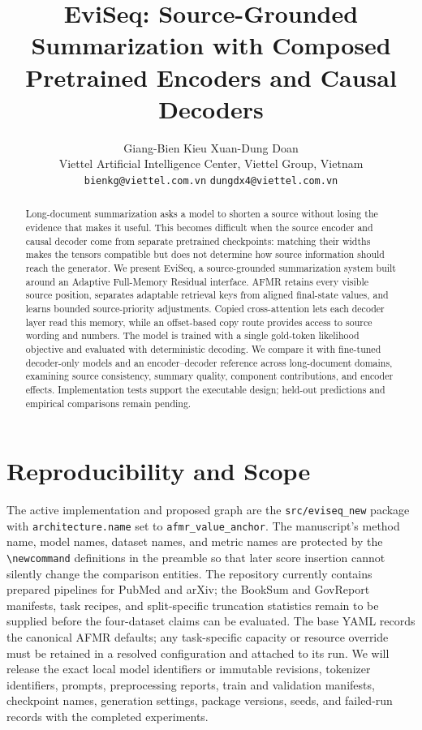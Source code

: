 \documentclass[11pt]{article}
\title{EviSeq: Source-Grounded Summarization with Composed Pretrained Encoders and Causal Decoders}
\author{
  Giang-Bien Kieu \quad Xuan-Dung Doan \\
  Viettel Artificial Intelligence Center, Viettel Group, Vietnam \\
  \texttt{bienkg@viettel.com.vn} \quad \texttt{dungdx4@viettel.com.vn}
}
\newcommand{\EviSeq}{EviSeq\xspace}
\newcommand{\AFMR}{AFMR\xspace}
\newcommand{\AFMRFull}{Adaptive Full-Memory Residual\xspace}
\newcommand{\PubMed}{PubMed\xspace}
\newcommand{\ArXiv}{arXiv\xspace}
\newcommand{\BookSum}{BookSum\xspace}
\newcommand{\GovReport}{GovReport\xspace}
\begin{document}
\maketitle

\begin{abstract}
Long-document summarization asks a model to shorten a source without losing the evidence that makes it useful. This becomes difficult when the source encoder and causal decoder come from separate pretrained checkpoints: matching their widths makes the tensors compatible but does not determine how source information should reach the generator. We present \EviSeq, a source-grounded summarization system built around an \AFMRFull{} interface. \AFMR retains every visible source position, separates adaptable retrieval keys from aligned final-state values, and learns bounded source-priority adjustments. Copied cross-attention lets each decoder layer read this memory, while an offset-based copy route provides access to source wording and numbers. The model is trained with a single gold-token likelihood objective and evaluated with deterministic decoding. We compare it with fine-tuned decoder-only models and an encoder--decoder reference across long-document domains, examining source consistency, summary quality, component contributions, and encoder effects. Implementation tests support the executable design; held-out predictions and empirical comparisons remain pending.
\end{abstract}





\section{Reproducibility and Scope}
\label{sec:repro}
The active implementation and proposed graph are the \texttt{src/eviseq\_new} package with \texttt{architecture.name} set to \texttt{afmr\_value\_anchor}. The manuscript's method name, model names, dataset names, and metric names are protected by the \verb|\newcommand| definitions in the preamble so that later score insertion cannot silently change the comparison entities. The repository currently contains prepared pipelines for \PubMed and \ArXiv; the \BookSum and \GovReport manifests, task recipes, and split-specific truncation statistics remain to be supplied before the four-dataset claims can be evaluated. The base YAML records the canonical \AFMR defaults; any task-specific capacity or resource override must be retained in a resolved configuration and attached to its run. We will release the exact local model identifiers or immutable revisions, tokenizer identifiers, prompts, preprocessing reports, train and validation manifests, checkpoint names, generation settings, package versions, seeds, and failed-run records with the completed experiments.
\end{document}
